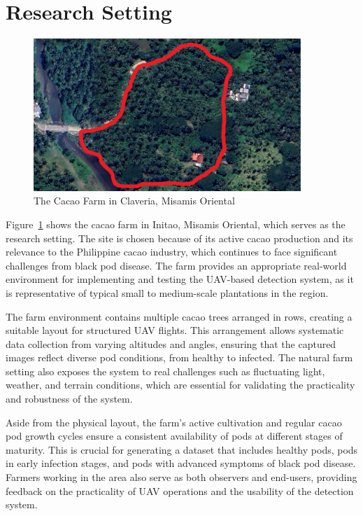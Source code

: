 \section{Research Setting}

\begin{figure}[H]
	\centering
	\caption{The Cacao Farm in Claveria, Misamis Oriental}
	\label{fig:cacao_farm}
	\includegraphics[width=0.9\textwidth]{figures/Cacao_Farm.pdf}
\end{figure}

Figure~\ref{fig:cacao_farm} shows the cacao farm in Initao, Misamis Oriental, which serves as the research setting.
The site is chosen because of its active cacao production and its relevance to the Philippine cacao industry, which continues to face significant challenges from black pod disease.
The farm provides an appropriate real-world environment for implementing and testing the UAV-based detection system, as it is representative of typical small to medium-scale plantations in the region.

The farm environment contains multiple cacao trees arranged in rows, creating a suitable layout for structured UAV flights.
This arrangement allows systematic data collection from varying altitudes and angles, ensuring that the captured images reflect diverse pod conditions, from healthy to infected.
The natural farm setting also exposes the system to real challenges such as fluctuating light, weather, and terrain conditions, which are essential for validating the practicality and robustness of the system.

Aside from the physical layout, the farm’s active cultivation and regular cacao pod growth cycles ensure a consistent availability of pods at different stages of maturity.
This is crucial for generating a dataset that includes healthy pods, pods in early infection stages, and pods with advanced symptoms of black pod disease.
Farmers working in the area also serve as both observers and end-users, providing feedback on the practicality of UAV operations and the usability of the detection system.

